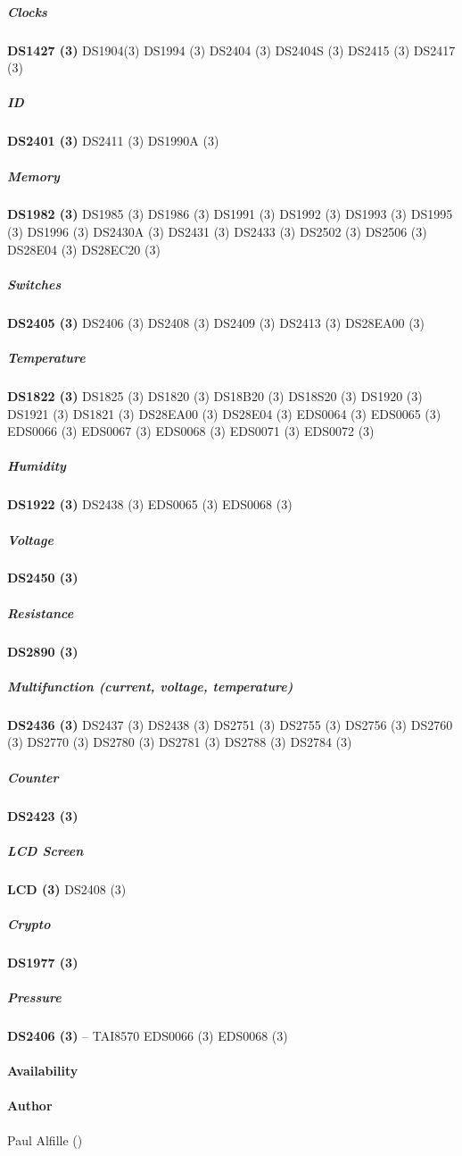 \subparagraph*{Clocks}\textsf{\textbf{DS1427 (3)} \textsf{DS1904(3)} \textsf{DS1994 (3)} \textsf{DS2404 (3)} \textsf{DS2404S (3)} \textsf{DS2415 (3)}
\textsf{DS2417 (3)}} 
\subparagraph*{ID}\textsf{\textbf{DS2401 (3)} \textsf{DS2411 (3)} \textsf{DS1990A (3)}} 
\subparagraph*{Memory}\textsf{\textbf{DS1982 (3)} \textsf{DS1985
(3)} \textsf{DS1986 (3)} \textsf{DS1991 (3)} \textsf{DS1992 (3)} \textsf{DS1993 (3)} \textsf{DS1995 (3)} \textsf{DS1996 (3)} \textsf{DS2430A
(3)} \textsf{DS2431 (3)} \textsf{DS2433 (3)} \textsf{DS2502 (3)} \textsf{DS2506 (3)} \textsf{DS28E04 (3)} \textsf{DS28EC20 (3)}}

\subparagraph*{Switches}\textsf{\textbf{DS2405 (3)} \textsf{DS2406 (3)} \textsf{DS2408 (3)} \textsf{DS2409 (3)} \textsf{DS2413 (3)} \textsf{DS28EA00
(3)}} 
\subparagraph*{Temperature}\textsf{\textbf{DS1822 (3)} \textsf{DS1825 (3)} \textsf{DS1820 (3)} \textsf{DS18B20 (3)} \textsf{DS18S20 (3)}
\textsf{DS1920 (3)} \textsf{DS1921 (3)} \textsf{DS1821 (3)} \textsf{DS28EA00 (3)} \textsf{DS28E04 (3)} \textsf{EDS0064 (3)} \textsf{EDS0065
(3)} \textsf{EDS0066 (3)} \textsf{EDS0067 (3)} \textsf{EDS0068 (3)} \textsf{EDS0071 (3)} \textsf{EDS0072 (3)}} 
\subparagraph*{Humidity}\textsf{\textbf{DS1922
(3)} \textsf{DS2438 (3)} \textsf{EDS0065 (3)} \textsf{EDS0068 (3)}} 
\subparagraph*{Voltage}\textsf{\textbf{DS2450 (3)}} 
\subparagraph*{Resistance}\textsf{\textbf{DS2890
(3)}} 
\subparagraph*{Multifunction (current, voltage, temperature)}\textsf{\textbf{DS2436 (3)} \textsf{DS2437 (3)}
\textsf{DS2438 (3)} \textsf{DS2751 (3)} \textsf{DS2755 (3)} \textsf{DS2756 (3)} \textsf{DS2760 (3)} \textsf{DS2770 (3)} \textsf{DS2780
(3)} \textsf{DS2781 (3)} \textsf{DS2788 (3)} \textsf{DS2784 (3)}} 
\subparagraph*{Counter}\textsf{\textbf{DS2423 (3)}} 
\subparagraph*{LCD Screen}\textsf{\textbf{LCD (3)}
\textsf{DS2408 (3)}} 
\subparagraph*{Crypto}\textsf{\textbf{DS1977 (3)}} 
\subparagraph*{Pressure}\textsf{\textbf{DS2406 (3)} -- TAI8570 \textsf{EDS0066 (3)} \textsf{EDS0068
(3)}}  
\paragraph*{Availability}
\paragraph*{Author}
Paul Alfille ()
